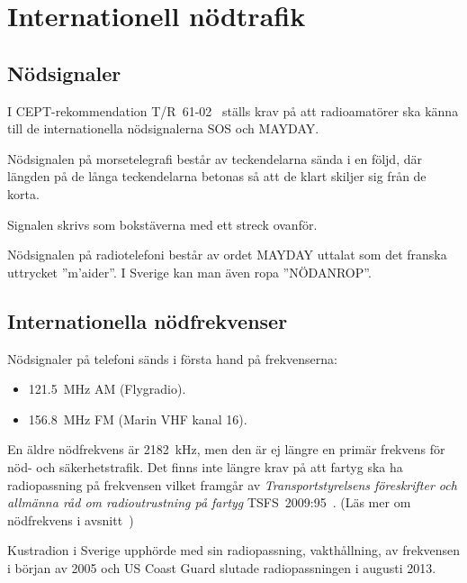 \section{Internationell nödtrafik}

\subsection{Nödsignaler}
\label{subsec:noedsignaler}

I CEPT-rekommendation T/R~61-02~\cite{TR6102} ställs krav på att radioamatörer
ska känna till de internationella nödsignalerna SOS och MAYDAY.

Nödsignalen på morsetelegrafi består av teckendelarna \Mcharsep\MSOS %
sända i en följd, där längden på de långa teckendelarna betonas så att de klart
skiljer sig från de korta.

Signalen skrivs som bokstäverna  med ett streck ovanför.

Nödsignalen på radiotelefoni består av ordet MAYDAY uttalat som det franska
uttrycket ''m'aider''. I Sverige kan man även ropa ''NÖDANROP''.

\subsection{Internationella nödfrekvenser}
\label{nödfrekvens}

Nödsignaler på telefoni sänds i första hand på frekvenserna:

\begin{itemize}
  \item \qty{121,5}{\mega\hertz} AM (Flygradio).
  \item \qty{156,8}{\mega\hertz} FM (Marin VHF kanal 16).
\end{itemize}

En äldre nödfrekvens är \qty{2182}{\kilo\hertz}, men den är ej längre en primär
frekvens för nöd- och säkerhetstrafik.
Det finns inte längre krav på att fartyg ska ha radiopassning på frekvensen
vilket framgår av \emph{Transportstyrelsens föreskrifter och allmänna råd
	om radioutrustning på fartyg} TSFS~2009:95~\cite[\S22]{TSFS2009:95}.
(Läs mer om nödfrekvens i avsnitt~)

\begin{historiabox}
Kustradion i Sverige upphörde med sin radiopassning, vakthållning, av frekvensen
i början av 2005 och US Coast Guard slutade radiopassningen i augusti 2013.
\end{historiabox}

